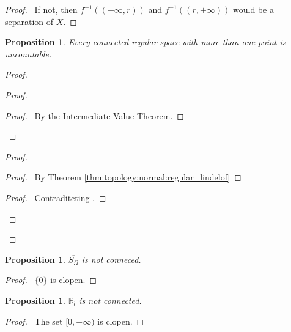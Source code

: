 \documentclass{report}
\let\qed\relax
\newtheorem{prop}[lm]{Proposition}
\theoremstyle{definition}
\begin{document}
  \begin{proof}
    \pf\ If not, then $f^{-1}((- \infty, r))$ and $f^{-1}((r, + \infty))$ would
    be a separation of $X$. \qed
  \end{proof}

   \begin{prop}
   Every connected regular space with more than one point is uncountable.
 \end{prop}

 \begin{proof}
  \pf
  \begin{proof}
    \begin{proof}
      \pf\ By the Intermediate Value Theorem.
    \end{proof}
  \end{proof}
  \begin{proof}
    \begin{proof}
      \pf\ By Theorem \ref{thm:topology:normal:regular_lindelof}
    \end{proof}
    \qedstep
    \begin{proof}
      \pf\ Contraditcting .
    \end{proof}
  \end{proof}
  \qed
 \end{proof}

  \begin{prop}
   $\overline{S_\Omega}$ is not conneced.
 \end{prop}

 \begin{proof}
   \pf\ $\{0\}$ is clopen. \qed
 \end{proof}

  \begin{prop}
   $\mathbb{R}_l$ is not connected.
 \end{prop}

 \begin{proof}
  \pf\ The set $[0, + \infty)$ is clopen. \qed
 \end{proof}
\end{document}

